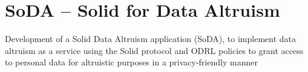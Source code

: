 \section{SoDA -- Solid for Data Altruism}
\label{sec:soda}

Development of a Solid Data Altruism application (SoDA), to implement data altruism as a service using the Solid protocol and ODRL policies to grant access to personal data for altruistic purposes in a privacy-friendly manner
